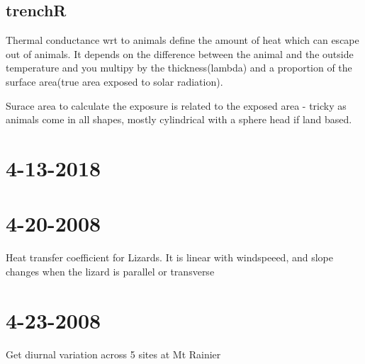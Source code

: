 \documentclass[]{book}
\theoremstyle{definition}
\theoremstyle{definition}
\theoremstyle{definition}
\theoremstyle{remark}
\begin{document}
\subsection{trenchR}\label{trenchr}

Thermal conductance wrt to animals define the amount of heat which can
escape out of animals. It depends on the difference between the animal
and the outside temperature and you multipy by the thickness(lambda) and
a proportion of the surface area(true area exposed to solar radiation).

Surace area to calculate the exposure is related to the exposed area -
tricky as animals come in all shapes, mostly cylindrical with a sphere
head if land based.

\section{4-13-2018}\label{section-1}

\section{4-20-2008}\label{section-2}

Heat transfer coefficient for Lizards. It is linear with windspeeed, and
slope changes when the lizard is parallel or transverse

\section{4-23-2008}\label{section-3}

Get diurnal variation across 5 sites at Mt Rainier
\end{document}
